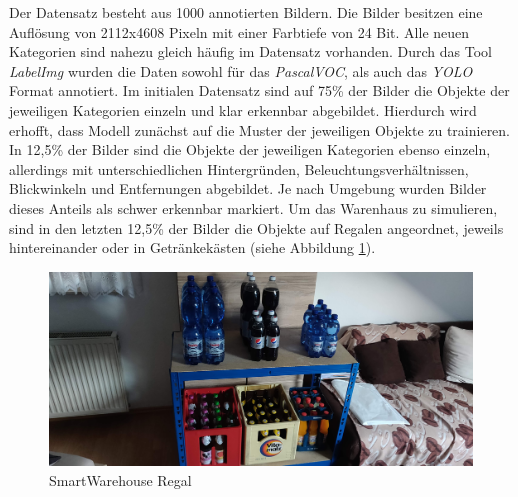 Der Datensatz besteht aus 1000 annotierten Bildern. Die Bilder besitzen eine Auflösung von 2112x4608 Pixeln mit einer Farbtiefe von 24 Bit. Alle neuen Kategorien sind nahezu gleich häufig im Datensatz vorhanden. Durch das Tool \textit{LabelImg} wurden die Daten sowohl für das \textit{PascalVOC}, als auch das \textit{YOLO} Format annotiert. Im initialen Datensatz sind auf 75\% der Bilder die Objekte der jeweiligen Kategorien einzeln und klar erkennbar abgebildet. Hierdurch wird erhofft, dass Modell zunächst auf die Muster der jeweiligen Objekte zu trainieren. In 12,5\% der Bilder sind die Objekte der jeweiligen Kategorien ebenso einzeln, allerdings mit unterschiedlichen Hintergründen, Beleuchtungsverhältnissen, Blickwinkeln und Entfernungen abgebildet. Je nach Umgebung wurden Bilder dieses Anteils als schwer erkennbar markiert. Um das Warenhaus zu simulieren, sind in den letzten 12,5\% der Bilder die Objekte auf Regalen angeordnet, jeweils hintereinander oder in Getränkekästen (siehe Abbildung \ref{regal}). 

\begin{figure}[ht]
	\begin{center}
		\includegraphics[width=16cm]{Bilder/regal.jpg} 
		\caption[Smart Warehouse Regal]{SmartWarehouse Regal}
		\label{regal}
	\end{center}
\end{figure}